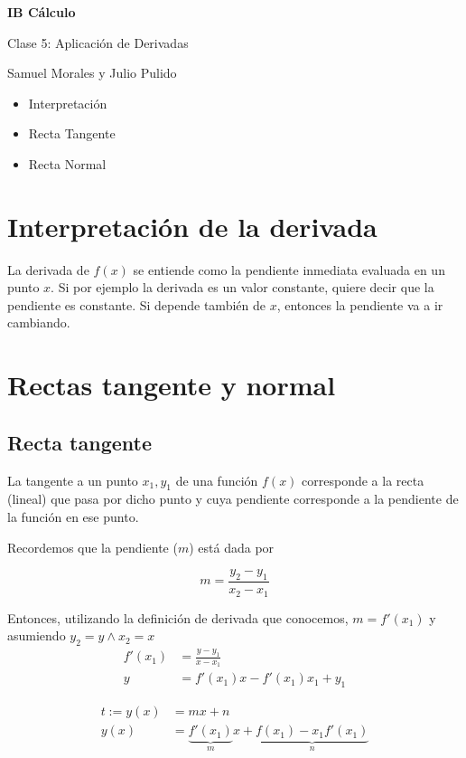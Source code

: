 \documentclass[spanish,12pt]{article}
\begin{document}
	\begin{titlepage}
	\begin{center}
	\hspace{0pt}
	\vfill
	{\Large\textbf{{IB Cálculo}}}
	
	\medskip
	Clase 5: Aplicación de Derivadas
	
	\medskip
    Samuel Morales y Julio Pulido
	
	\thispagestyle{empty}
	\vfill
	\end{center}
	\end{titlepage}
\newpage
\tableofcontents
\newpage
\begin{itemize}
    \item Interpretación
    \item Recta Tangente
    \item Recta Normal
\end{itemize}
\section{Interpretación de la derivada}

La derivada de $f(x)$ se entiende como la pendiente inmediata evaluada en un punto $x$. Si por ejemplo la derivada es un valor constante, quiere decir que la pendiente es constante. Si depende también de $x$, entonces la pendiente va a ir cambiando.

\section{Rectas tangente y normal}
\subsection{Recta tangente}
La tangente a un punto $x_1,y_1$ de una función $f(x)$ corresponde a la recta (lineal) que pasa por dicho punto y cuya pendiente corresponde a la pendiente de la función en ese punto.

Recordemos que la pendiente ($m$) está dada por

$$m=\frac{y_2-y_1}{x_2-x_1}$$

Entonces, utilizando la definición de derivada que conocemos, $m=f'(x_1)$ y asumiendo $y_2=y \land x_2=x$
\begin{align*}
    f'(x_1)&=\frac{y-y_1}{x-x_1}\\
    y&=f'(x_1)x-f'(x_1)x_1+y_1
\end{align*}

\begin{align*}
    t:=y(x)&=mx+n\\
    y(x)&=\underbrace{f'(x_1)}_{m}x+\underbrace{f(x_1)-x_1f'(x_1)}_{n}\\
\end{align*}
\end{document}
